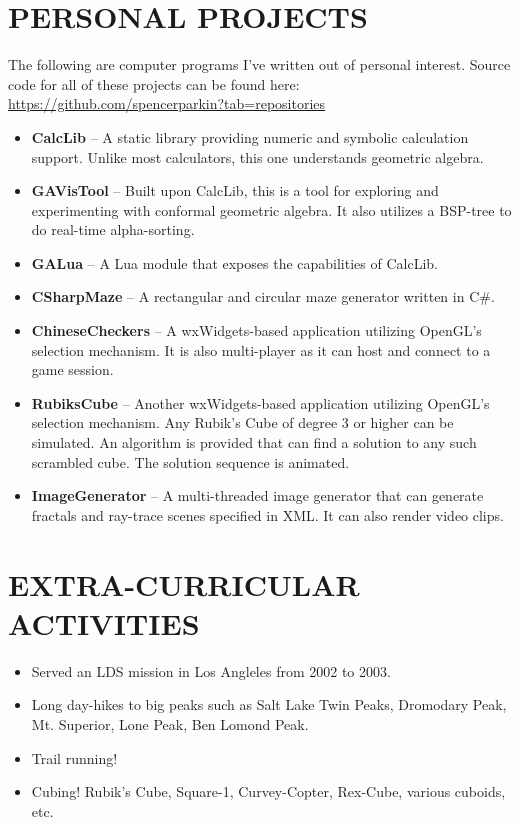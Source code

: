 \documentclass[margin]{res}
\begin{document}
\begin{resume}
\begin{itemize}
		\end{itemize}

\section{PERSONAL PROJECTS}
		The following are computer programs I've written out of personal interest.  Source code for all of these projects can be found here: \url{https://github.com/spencerparkin?tab=repositories}
		\begin{itemize}\itemsep -2pt %
		\item \textbf{CalcLib} -- A static library providing numeric and symbolic calculation support.  Unlike most calculators, this one understands geometric algebra.
		\item \textbf{GAVisTool} -- Built upon CalcLib, this is a tool for exploring and experimenting with conformal geometric algebra.  It also utilizes a BSP-tree to do real-time alpha-sorting.
		\item \textbf{GALua} -- A Lua module that exposes the capabilities of CalcLib.
		\item \textbf{CSharpMaze} -- A rectangular and circular maze generator written in C\#.
		\item \textbf{ChineseCheckers} -- A wxWidgets-based application utilizing OpenGL's selection mechanism.  It is also multi-player as it can host and connect to a game session.
		\item \textbf{RubiksCube} -- Another wxWidgets-based application utilizing OpenGL's selection mechanism.  Any Rubik's Cube of degree 3 or higher can be simulated.  An algorithm is provided that can find a solution to any such scrambled cube.  The solution sequence is animated.
		\item \textbf{ImageGenerator} -- A multi-threaded image generator that can generate fractals and ray-trace scenes specified in XML.  It can also render video clips.
		\end{itemize}

\section{EXTRA-CURRICULAR \\ ACTIVITIES}
		\begin{itemize}\itemsep -2pt %
		\item Served an LDS mission in Los Angleles from 2002 to 2003.
		\item Long day-hikes to big peaks such as Salt Lake Twin Peaks, Dromodary Peak, Mt. Superior, Lone Peak, Ben Lomond Peak.
		\item Trail running!
		\item Cubing!  Rubik's Cube, Square-1, Curvey-Copter, Rex-Cube, various cuboids, etc.
		\end{itemize}

\end{resume}
\end{document}
